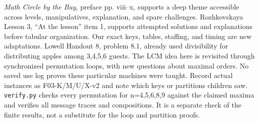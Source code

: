 \documentclass[12pt]{extarticle}
\begin{document}
\emph{Math Circle by the Bay}, preface pp. viii--x, supports a deep theme accessible across levels, manipulatives, explanation, and spare challenges. Rozhkovskaya Lesson 3, ``At the lesson'' item 1, supports attempted solutions and explanations before tabular organization. Our exact keys, tables, staffing, and timing are new adaptations.
Lowell Handout 8, problem 8.1, already used divisibility for distributing apples among 3,4,5,6 guests. The LCM idea here is revisited through synchronized permutation loops, with new questions about maximal orders. No saved use log proves these particular machines were taught. Record actual instances as F03-K/M/U/X-v2 and note which keys or partitions children saw.
\texttt{verify.py} checks every permutation for n=4,5,6,8,9 against the claimed maxima and verifies all message traces and compositions. It is a separate check of the finite results, not a substitute for the loop and partition proofs.
\end{document}

